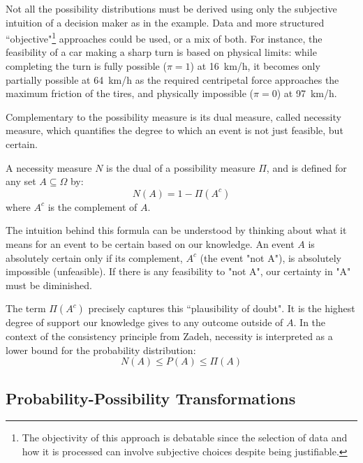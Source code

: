 \begin{remark}
    Not all the possibility distributions must be derived using only the subjective intuition of a decision maker as in the example. Data and more structured ``objective"\footnote{The objectivity of this approach is debatable since the selection of data and how it is processed can involve subjective choices despite being justifiable.} approaches could be used, or a mix of both. 
    For instance, the feasibility of a car making a sharp turn is based on physical limits: while completing the turn is fully possible ($\pi=1$) at 16~km/h, it becomes only partially possible at 64~km/h as the required centripetal force approaches the maximum friction of the tires, and physically impossible ($\pi=0$) at 97~km/h.
\end{remark}

Complementary to the possibility measure is its dual measure, called necessity measure, which quantifies the degree to which an event is not just feasible, but certain.

\begin{definition}
A necessity measure $N$ is the dual of a possibility measure $\Pi$, and is defined for any set $A \subseteq \Omega$ by:
\[ N(A) = 1 - \Pi(A^c) \]
where $A^c$ is the complement of $A$.
\end{definition}

The intuition behind this formula can be understood by thinking about what it means for an event to be certain based on our knowledge. An event $A$ is absolutely certain only if its complement, $A^c$ (the event "not A"), is absolutely impossible (unfeasible). If there is any feasibility to "not A", our certainty in "A" must be diminished.

The term $\Pi(A^c)$ precisely captures this ``plausibility of doubt". It is the highest degree of support our knowledge gives to any outcome outside of $A$. In the context of the consistency principle from Zadeh, necessity is interpreted as a lower bound for the probability distribution:
\[N(A) \le P(A) \le \Pi(A)\]

\subsection{Probability-Possibility Transformations}


